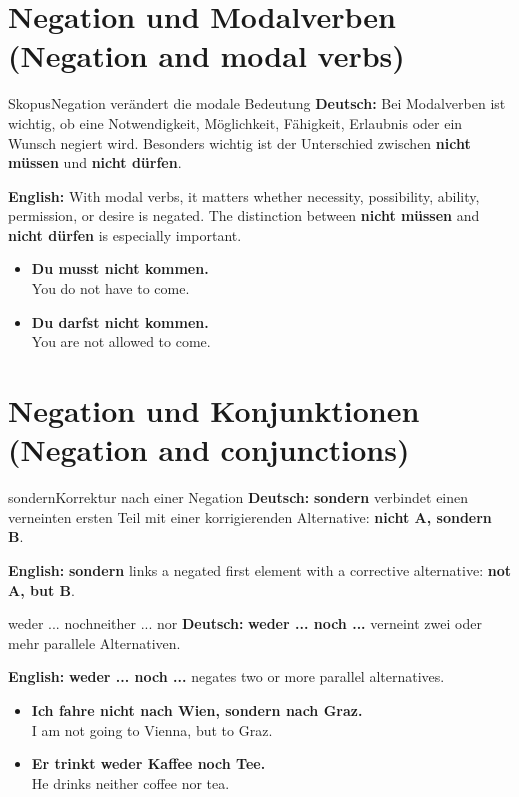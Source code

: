 \documentclass[a4paper,11pt]{article}
\newcommand{\GermanText}[1]{\textbf{Deutsch: }#1\par}
\newcommand{\EnglishText}[1]{{\small\color{SoftGray}\textbf{English: }#1\par}}
\newcommand{\ExampleItem}[2]{\item \textbf{#1}\\{\small\color{SoftGray}#2}}
\begin{document}
\section{Negation und Modalverben \textnormal{(Negation and modal verbs)}}
\begin{grammarentry}{Skopus}{Negation verändert die modale Bedeutung}
\GermanText{Bei Modalverben ist wichtig, ob eine Notwendigkeit, Möglichkeit, Fähigkeit, Erlaubnis oder ein Wunsch negiert wird. Besonders wichtig ist der Unterschied zwischen \textbf{nicht müssen} und \textbf{nicht dürfen}.}
\EnglishText{With modal verbs, it matters whether necessity, possibility, ability, permission, or desire is negated. The distinction between \textbf{nicht müssen} and \textbf{nicht dürfen} is especially important.}
\end{grammarentry}
\begin{exbox}\begin{itemize}
\ExampleItem{Du musst nicht kommen.}{You do not have to come.}
\ExampleItem{Du darfst nicht kommen.}{You are not allowed to come.}
\end{itemize}\end{exbox}

\section{Negation und Konjunktionen \textnormal{(Negation and conjunctions)}}
\begin{grammarentry}{sondern}{Korrektur nach einer Negation}
\GermanText{\textbf{sondern} verbindet einen verneinten ersten Teil mit einer korrigierenden Alternative: \textbf{nicht A, sondern B}.}
\EnglishText{\textbf{sondern} links a negated first element with a corrective alternative: \textbf{not A, but B}.}
\end{grammarentry}
\begin{grammarentry}{weder ... noch}{neither ... nor}
\GermanText{\textbf{weder ... noch ...} verneint zwei oder mehr parallele Alternativen.}
\EnglishText{\textbf{weder ... noch ...} negates two or more parallel alternatives.}
\end{grammarentry}
\begin{exbox}\begin{itemize}
\ExampleItem{Ich fahre nicht nach Wien, sondern nach Graz.}{I am not going to Vienna, but to Graz.}
\ExampleItem{Er trinkt weder Kaffee noch Tee.}{He drinks neither coffee nor tea.}
\end{itemize}\end{exbox}
\end{document}
